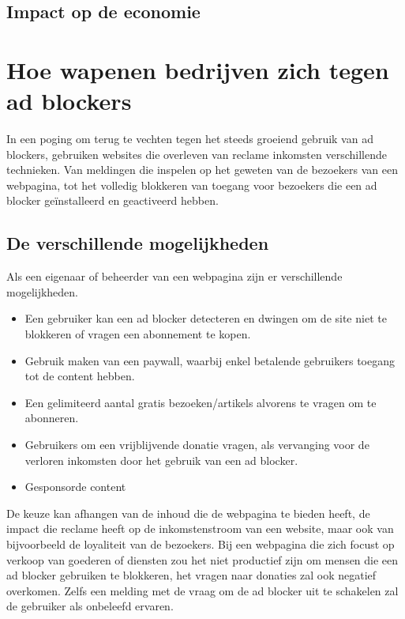 \documentclass[pdftex,a4paper,12pt,twoside]{report}
\begin{document}
\section{Impact op de economie}
\label{sec:Impact op de economie}


\chapter{Hoe wapenen bedrijven zich tegen ad blockers}
\label{ch:Hoe wapenen bedrijven zich tegen ad blockers}
In een poging om terug te vechten tegen het steeds groeiend gebruik van ad blockers, gebruiken websites die overleven van reclame inkomsten verschillende technieken. Van meldingen die inspelen op het geweten van de bezoekers van een webpagina, tot het volledig blokkeren van toegang voor bezoekers die een ad blocker geïnstalleerd en geactiveerd hebben.

\section{De verschillende mogelijkheden}
\label{sec:De Verschillende mogelijkheden}
Als een eigenaar of beheerder van een webpagina zijn er verschillende mogelijkheden. 

\begin{itemize}
	\item Een gebruiker kan een ad blocker detecteren en dwingen om de site niet te blokkeren of vragen een abonnement te kopen.
	\item Gebruik maken van een paywall, waarbij enkel betalende gebruikers toegang tot de content hebben.
	\item Een gelimiteerd aantal gratis bezoeken/artikels alvorens te vragen om te abonneren.
	\item Gebruikers om een vrijblijvende donatie vragen, als vervanging voor de verloren inkomsten door het gebruik van een ad blocker.
	\item Gesponsorde content
	
\end{itemize}

De keuze kan afhangen van de inhoud die de webpagina te bieden heeft, de impact die reclame heeft op de inkomstenstroom van een website, maar ook van bijvoorbeeld de loyaliteit van de bezoekers. Bij een webpagina die zich focust op verkoop van goederen of diensten zou het niet productief zijn om mensen die een ad blocker gebruiken te blokkeren, het vragen naar donaties zal ook negatief overkomen. Zelfs een melding met de vraag om de ad blocker uit te schakelen zal de gebruiker als onbeleefd ervaren.
\end{document}
